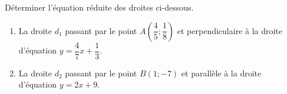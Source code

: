 \documentclass{beamer}
\begin{document}
\begin{frame}{}
Déterminer l'équation réduite des droites ci-dessous.

\begin{enumerate}
    \item La droite \(d_1\) passant par le point \(A\left(\dfrac{4}{5}; \dfrac{1}{8}\right)\) et perpendiculaire à la droite d'équation \(y = \dfrac{4}{7}x + \dfrac{1}{3}\).
    \item La droite \(d_2\) passant par le point \(B(1; -7)\) et parallèle à la droite d'équation \(y = 2x + 9\).
\end{enumerate}

\end{frame}
\end{document}
